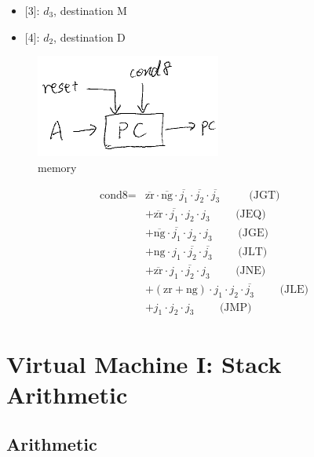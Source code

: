 \documentclass[a4paper]{book}
\begin{document}
\begin{itemize}
    \item {}[3]: $d_3$, destination M
    \item {}[4]: $d_2$, destination D
\end{itemize}



\begin{figure}[H]
    \centering
    \includegraphics{pic/project05/cpu3.png}
    \caption{memory}
\end{figure}


\begin{align*}
    \text{cond8} = & \overline{\text{zr}} \cdot \overline{\text{ng}} \cdot \overline{j_1} \cdot \overline{j_2} \cdot \overline{j_3} \text{~~~~~~~ (JGT)} \\
                 & + \overline{\text{zr}} \cdot \overline{j_1} \cdot j_2 \cdot j_3 \text{~~~~~~ (JEQ)} \\
                 & + \overline{\text{ng}} \cdot \overline{j_1} \cdot j_2 \cdot j_3 \text{~~~~~~ (JGE)} \\
                 & + \text{ng} \cdot j_1 \cdot \overline{j_2} \cdot \overline{j_3} \text{~~~~~~ (JLT)} \\
                 & + \overline{\text{zr}} \cdot j_1 \cdot \overline{j_2} \cdot j_3 \text{~~~~~~ (JNE)} \\
                 & + (\text{zr} + \text{ng}) \cdot j_1 \cdot j_2 \cdot \overline{j_3} \text{~~~~~~ (JLE)} \\
                 & + j_1 \cdot j_2 \cdot j_3 \text{~~~~~~ (JMP)}
\end{align*}

\setcounter{chapter}{6}
\chapter{Virtual Machine I: Stack Arithmetic}
\section{Arithmetic}
\end{document}

